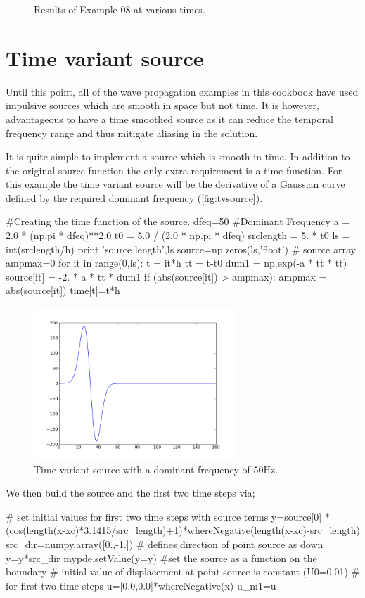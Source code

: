 \begin{figure}[htp]
{\label{fig:ex08pw950}
}
\label{fig:ex08pw}
\caption{Results of Example 08 at various times.}
\end{figure}
\clearpage

\section{Time variant source}

Until this point, all of the wave propagation examples in this cookbook have
used impulsive sources which are smooth in space but not time. It is however,
advantageous to have a time smoothed source as it can reduce the temporal
frequency range and thus mitigate aliasing in the solution. 

It is quite 
simple to implement a source which is smooth in time. In addition to the
original source function the only extra requirement is a time function. For
this example the time variant source will be the derivative of a Gaussian curve
defined by the required dominant frequency (\autoref{fig:tvsource}).
\begin{python}
#Creating the time function of the source.
dfeq=50 #Dominant Frequency
a = 2.0 * (np.pi * dfeq)**2.0
t0 = 5.0 / (2.0 * np.pi * dfeq)
srclength = 5. * t0
ls = int(srclength/h)
print 'source length',ls
source=np.zeros(ls,'float') # source array
ampmax=0
for it in range(0,ls):
    t = it*h
    tt = t-t0
    dum1 = np.exp(-a * tt * tt)
    source[it] = -2. * a * tt * dum1
    if (abs(source[it]) > ampmax):
        ampmax = abs(source[it])
    time[t]=t*h
\end{python}
\begin{figure}[ht]
\centering
\includegraphics[width=3in]{figures/source.png}
\caption{Time variant source with a dominant frequency of 50Hz.}
\label{fig:tvsource}
\end{figure}

We then build the source and the first two time steps via;
\begin{python}
# set initial values for first two time steps with source terms
y=source[0]
*(cos(length(x-xc)*3.1415/src_length)+1)*whereNegative(length(x-xc)-src_length)
src_dir=numpy.array([0.,-1.]) # defines direction of point source as down
y=y*src_dir
mypde.setValue(y=y) #set the source as a function on the boundary
# initial value of displacement at point source is constant (U0=0.01)
# for first two time steps
u=[0.0,0.0]*whereNegative(x)
u_m1=u
\end{python}

